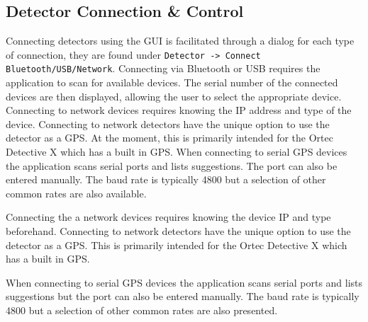 \subsection{Detector Connection \& Control}
Connecting detectors using the GUI is facilitated through a dialog for each type of connection, they are found under \texttt{Detector -> Connect Bluetooth/USB/Network}. Connecting via Bluetooth or USB requires the application to scan for available devices. The serial number of the connected devices are then displayed, allowing the user to select the appropriate device.
Connecting to network devices requires knowing the IP address and type of the device. Connecting to network detectors have the unique option to use the detector as a GPS. At the moment, this is primarily intended for the Ortec Detective X which has a built in GPS.
When connecting to serial GPS devices the application scans serial ports and lists suggestions. The port can also be entered manually. The baud rate is typically 4800 but a selection of other common rates are also available.

Connecting the a network devices requires knowing the device IP and type beforehand. Connecting to network detectors have the unique option to use the detector as a GPS. This is primarily intended for the Ortec Detective X which has a built in GPS.

When connecting to serial GPS devices the application scans serial ports and lists suggestions but the port can also be entered manually. The baud rate is typically 4800 but a selection of other common rates are also presented.